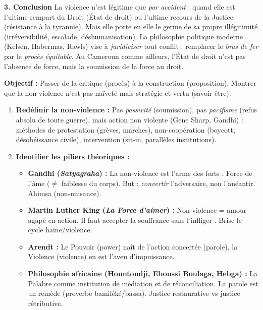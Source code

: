 \documentclass[11pt]{article}
\newcommand{\cle}[1]{{\popxbold\color{popdark}#1}}
\begin{document}
\begin{exoresolu}
\textbf{3. Conclusion}
La violence n'est légitime que \emph{par accident} : quand elle est l'ultime rempart du Droit (État de droit) ou l'ultime recours de la Justice (résistance à la tyrannie). Mais elle porte en elle le germe de sa propre illégitimité (irréversibilité, escalade, déshumanisation). La philosophie politique moderne (Kelsen, Habermas, Rawls) vise à \emph{juridiciser} tout conflit : remplacer le \emph{bras de fer} par le \emph{procès équitable}. Au Cameroun comme ailleurs, l'État de droit n'est pas l'absence de force, mais la \cle{soumission de la force au droit}.
\end{exoresolu}

\begin{methode}
\textbf{Objectif :} Passer de la critique (procès) à la \cle{construction} (proposition). Montrer que la non-violence n'est pas naïveté mais \cle{stratégie} et \cle{vertu} (savoir-être).
\begin{enumerate}
    \item \textbf{Redéfinir la non-violence :} Pas \emph{passivité} (soumission), pas \emph{pacifisme} (refus absolu de toute guerre), mais \cle{action non violente} (Gene Sharp, Gandhi) : méthodes de protestation (grèves, marches), non-coopération (boycott, désobéissance civile), intervention (sit-in, parallèles institutions).
    \item \textbf{Identifier les piliers théoriques :}
        \begin{itemize}
            \item \textbf{Gandhi (\emph{Satyagraha}) :} \guillemotleft La non-violence est l'arme des forts \guillemotright. Force de l'âme ($\neq$ faiblesse du corps). But : \emph{convertir} l'adversaire, non l'anéantir. \cle{Ahimsa} (non-nuisance).
            \item \textbf{Martin Luther King (\emph{La Force d'aimer}) :} Non-violence = amour agapè en action. \guillemotleft Il faut accepter la souffrance sans l'infliger \guillemotright. Brise le cycle haine/violence.
            \item \textbf{Arendt :} Le \cle{Pouvoir} (power) naît de l'action concertée (parole), la \cle{Violence} (violence) en est l'aveu d'impuissance.
            \item \textbf{Philosophie africaine (Hountondji, Eboussi Boulaga, Hebga) :} La \cle{Palabre} comme institution de \cle{médiation} et de \cle{réconciliation}. \guillemotleft La parole est un remède \guillemotright (proverbe bamiléké/bassa). Justice restaurative vs justice rétributive.

\end{itemize}
\end{enumerate}
\end{methode}
\end{document}

